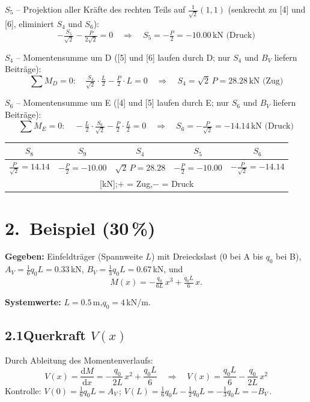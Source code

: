 \documentclass[a4paper,11pt]{article}
\begin{document}
\textbf{$S_5$} -- Projektion aller Kräfte des rechten Teils auf $\tfrac{1}{\sqrt{2}}(1,1)$
(senkrecht zu [4] und [6], eliminiert $S_4$ und $S_6$):
\[
  -\tfrac{S_5}{\sqrt{2}} - \tfrac{P}{2\sqrt{2}} = 0
  \quad\Rightarrow\quad \boxed{S_5 = -\tfrac{P}{2} = -10.00\,\text{kN (Druck)}}
\]

\textbf{$S_4$} -- Momentensumme um D
([5] und [6] laufen durch D; nur $S_4$ und $B_V$ liefern Beiträge):
\[
  \sum M_D = 0:\quad \tfrac{S_4}{\sqrt{2}}\cdot\tfrac{L}{2} - \tfrac{P}{2}\cdot L = 0
  \quad\Rightarrow\quad \boxed{S_4 = \sqrt{2}\,P = 28.28\,\text{kN (Zug)}}
\]

\textbf{$S_6$} -- Momentensumme um E
([4] und [5] laufen durch E; nur $S_6$ und $B_V$ liefern Beiträge):
\[
  \sum M_E = 0:\quad -\tfrac{L}{2}\cdot\tfrac{S_6}{\sqrt{2}} - \tfrac{P}{2}\cdot\tfrac{L}{2} = 0
  \quad\Rightarrow\quad \boxed{S_6 = -\tfrac{P}{\sqrt{2}} = -14.14\,\text{kN (Druck)}}
\]

\medskip
\begin{center}
\begin{tabular}{ccccc}
\toprule
$S_8$ & $S_9$ & $S_4$ & $S_5$ & $S_6$ \\
\midrule
$\tfrac{P}{\sqrt{2}} = 14.14$ & $-\tfrac{P}{2} = -10.00$ &
$\sqrt{2}\,P = 28.28$ & $-\tfrac{P}{2} = -10.00$ & $-\tfrac{P}{\sqrt{2}} = -14.14$ \\
\multicolumn{5}{c}{\small [kN];\quad $+$ = Zug,\quad $-$ = Druck} \\
\bottomrule
\end{tabular}
\end{center}

\newpage
\section*{2.~Beispiel \hfill (30\,\%)}

\textbf{Gegeben:} Einfeldträger (Spannweite $L$) mit Dreieckslast
(0 bei A bis $q_0$ bei B),
$A_V = \tfrac{1}{6}q_0 L = 0.33$\,kN,
$B_V = \tfrac{1}{3}q_0 L = 0.67$\,kN, und
\[
  M(x) = -\tfrac{q_0}{6L}\,x^3 + \tfrac{q_0 L}{6}\,x.
\]

\textbf{Systemwerte:} $L = 0.5$\,m,\quad $q_0 = 4$\,kN/m.

\subsection*{2.1\quad Querkraft $V(x)$}

Durch Ableitung des Momentenverlaufs:
\[
  V(x) = \frac{\mathrm{d}M}{\mathrm{d}x}
        = -\frac{q_0}{2L}\,x^2 + \frac{q_0 L}{6}
  \quad\Rightarrow\quad
  \boxed{V(x) = \frac{q_0 L}{6} - \frac{q_0}{2L}\,x^2}
\]
Kontrolle: $V(0) = \tfrac{1}{6}q_0 L = A_V$\,\checkmark;\quad
$V(L) = \tfrac{1}{6}q_0 L - \tfrac{1}{2}q_0 L = -\tfrac{1}{3}q_0 L = -B_V$\,\checkmark.
\end{document}
